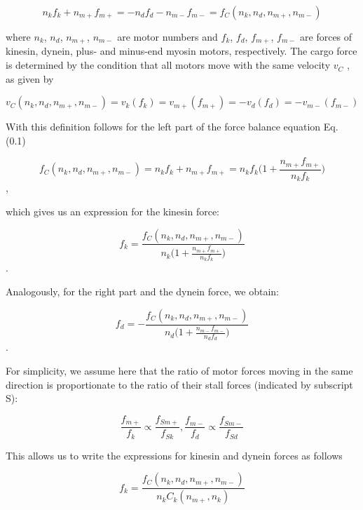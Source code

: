 \begin{equation}
n_kf_k + n_{m+}f_{m+} = -n_df_d - n_{m-}f_{m-} = f_C(n_k, n_d, n_{m+}, n_{m-})
\end{equation}

where $n_k$, $n_d$, $n_{m+}$, $n_{m-}$ are motor numbers and $f_k$, $f_d$, $f_{m+}$, $f_{m-}$ are forces of kinesin, dynein, plus- and minus-end myosin motors, respectively. The cargo force is determined by the condition that all motors move with the same velocity $v_C$ , as given by

\begin{equation}
v_C(n_k, n_d, n_{m+}, n_{m-}) = v_k(f_k) = v_{m+}(f_{m+}) = - v_d(f_d) = - v_{m-}(f_{m-})
\end{equation}

With this definition follows for the left part of the force balance equation Eq. (0.1)

\begin{equation}
f_C(n_k, n_d, n_{m+}, n_{m-}) = n_kf_k + n_{m+}f_{m+} = n_kf_k\big(1 + \frac{n_{m+}f_{m+}}{n_kf_{k}}\big)
\end{equation},

which gives us an expression for the kinesin force:

\begin{equation}
f_k = \frac{f_C(n_k, n_d, n_{m+}, n_{m-})}{n_k\big(1 + \frac{n_{m+}f_{m+}}{n_kf_{k}}\big)}
\end{equation}.

Analogously, for the right part and the dynein force, we obtain:

\begin{equation}
f_d = -\frac{f_C(n_k, n_d, n_{m+}, n_{m-})}{n_d\big(1 + \frac{n_{m-}f_{m-}}{n_df_{d}}\big)}
\end{equation}.

For simplicity, we assume here that the ratio of motor forces moving in the same direction is proportionate to the ratio of their stall forces (indicated by subscript S):

\begin{equation}
\frac{f_{m+}}{f_k} \propto \frac{f_{Sm+}}{f_{Sk}}, 
\frac{f_{m-}}{f_d} \propto \frac{f_{Sm-}}{f_{Sd}}
\end{equation}

This allows us to write the expressions for kinesin and dynein forces as follows

\begin{equation}
f_k = \frac{f_C(n_k, n_d, n_{m+}, n_{m-})}{n_kC_k(n_{m+}, n_k)}
\end{equation}

